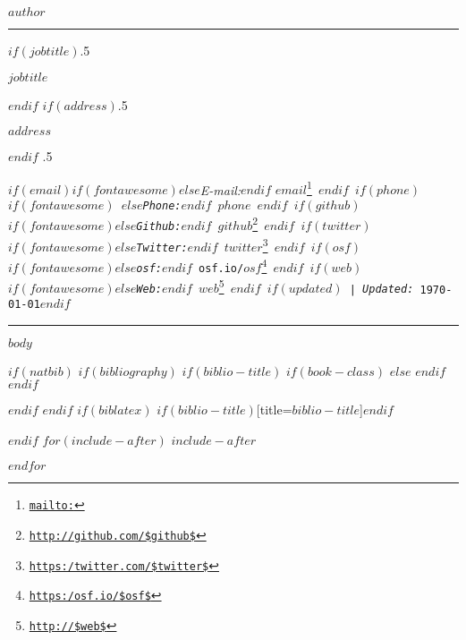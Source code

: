 \documentclass[$if(fontsize)$$fontsize$,$endif$$if(lang)$$babel-lang$,$endif$$if(papersize)$$papersize$paper,$endif$$for(classoption)$$classoption$$sep$,$endfor$]{$documentclass$}
\renewcommand{\href}[2]{#2\footnote{\url{#1}}}
\begin{document}
              
              
              \centerline{\huge \bf $author$}
              
              \vspace{2 mm}
              
              \hrule
              
              \vspace{2 mm}
              
              $if(jobtitle)$\moveleft.5\hoffset\centerline{$jobtitle$}$endif$
                $if(address)$\moveleft.5\hoffset\centerline{$address$}$endif$
                \moveleft.5\hoffset\centerline{ $if(email)$$if(fontawesome)$\faEnvelopeO \hspace{1 mm}$else$\emph{E-mail:}$endif$ \href{mailto:}{\tt $email$} \hspace{1 mm}$endif$ $if(phone)$$if(fontawesome)$ \faPhone \hspace{1 mm}$else$\emph{Phone:}$endif$  $phone$  \hspace{1 mm} $endif$ $if(github)$$if(fontawesome)$\faGithub \hspace{1 mm}$else$\emph{Github:}$endif$ \href{http://github.com/$github$}{\tt $github$} \hspace{1 mm} $endif$  $if(twitter)$$if(fontawesome)$\faTwitter \hspace{1 mm}$else$\emph{Twitter:}$endif$ \href{https:/twitter.com/$twitter$}{\tt $twitter$} \hspace{1 mm} $endif$ $if(osf)$$if(fontawesome)$\faUnlock \hspace{1 mm}$else$\emph{osf:}$endif$ \href{https:/osf.io/$osf$}{\tt osf.io/$osf$} \hspace{1 mm} $endif$ $if(web)$$if(fontawesome)$\faGlobe \hspace{1 mm}$else$\emph{Web:}$endif$ \href{http://$web$}{\tt $web$}  $endif$ $if(updated)$ | \emph{Updated:} \apstylekinda\today$endif$} 
              
              \vspace{2 mm}
              
              \hrule
              
              
              $body$
                
                $if(natbib)$
                $if(bibliography)$
                $if(biblio-title)$
                $if(book-class)$
                \renewcommand\bibname{$biblio-title$}
              $else$
                \renewcommand\refname{$biblio-title$}
              $endif$
                $endif$
                
              
              $endif$
                $endif$
                $if(biblatex)$
                \printbibliography$if(biblio-title)$[title=$biblio-title$]$endif$
                
                $endif$
                $for(include-after)$
                $include-after$
                
                $endfor$
                
\end{document}
